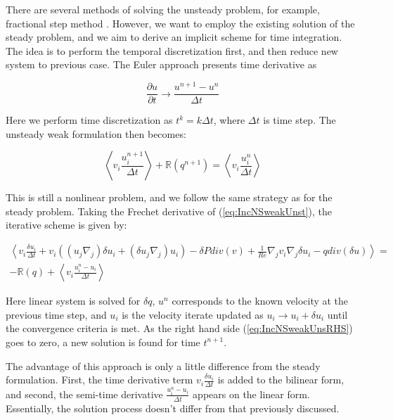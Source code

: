 There are several methods of solving the unsteady problem, for example, fractional step method \cite{DoneaFrac}. However, we want to employ the existing solution of the steady problem, and we aim to derive an implicit scheme for time integration. The idea is to perform the temporal discretization first, and then reduce new system to previous case. The Euler approach presents time derivative as

\begin{equation*}
    \frac{\partial u}{\partial t} \rightarrow \frac{u^{n+1} - u^n}{\Delta t}
\end{equation*}

Here we perform time discretization as $t^k = k\Delta t$, where $\Delta t$ is time step. The unsteady weak formulation then becomes:

\begin{equation}
\label{eq:IncNSweakUnst}
    \left< v_i \frac{u^{n+1}_i}{\Delta t} \right> + \mathbb{R}(q^{n+1}) = \left< v_i \frac{u^{n}_i}{\Delta t} \right>
\end{equation}

This is still a nonlinear problem, and we follow the same strategy as for the steady problem. Taking the Frechet derivative of (\ref{eq:IncNSweakUnst}), the iterative scheme is given by:

\begin{subequations}
\begin{align}
    \left< v_i \frac{\delta u_i}{\Delta t}  + v_i \left( (u_j \nabla_j) \delta u_i + (\delta  u_j \nabla_j) u_i \right) - \delta  P div(v) + \frac{1}{Re}\nabla_j v_i \nabla_j \delta  u_i - q div(\delta u)\right> = \\
    \label{eq:IncNSweakUnsRHS}
    - \mathbb{R}(q) + \left< v_i \frac{u^{n}_i - u_i}{\Delta t} \right>
\end{align}
\end{subequations}

Here linear system is solved for $\delta q$, $u^n$ corresponds to the known velocity at the previous time step, and $u_i$ is the velocity iterate updated as $u_i \rightarrow u_i + \delta u_i$ until the convergence criteria is met. As the right hand side (\ref{eq:IncNSweakUnsRHS}) goes to zero, a new solution is found for time $t^{n+1}$.

The advantage of this approach is only a little difference from the steady formulation. First, the time derivative term $v_i \frac{\delta u_i}{\Delta t}$ is added to the bilinear form, and second, the semi-time derivative $\frac{u^{n}_i - u_i}{\Delta t}$ appears on the linear form. Essentially, the solution process doesn't differ from that previously discussed. 
\clearpage
